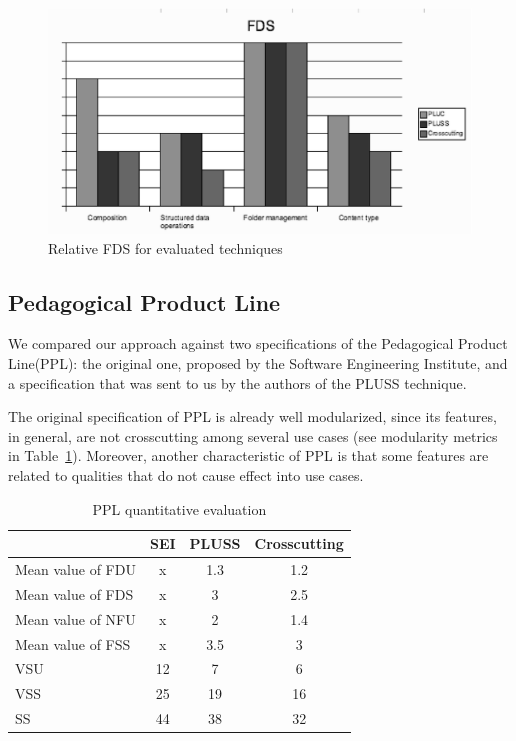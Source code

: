 \documentclass{acm_proc_article-sp}
\begin{document}
 \begin{figure}[h]
 \begin{center}
  \includegraphics[scale=0.35]{img/fds-mms.eps}
  \caption{Relative FDS for evaluated techniques}
  \label{fig:fds-mms}
  \end{center}
\end{figure}
  
\subsection{Pedagogical Product Line}

We compared our approach against two specifications of the Pedagogical Product Line(PPL): the original one, proposed by the Software Engineering Institute, and a specification that was sent to us by the authors of the PLUSS technique. 

The original specification of PPL is already well modularized, since its features, in general, are not crosscutting among several use cases (see modularity metrics in Table~\ref{tab:ppl-metrics}). Moreover, another characteristic of PPL is that some features are related to qualities that do not cause effect into use cases. 

\begin{table}[hb]
\centering
\caption{PPL quantitative evaluation}
\label{tab:ppl-metrics}
\begin{small}
\begin{tabular}{lccc} \hline
					& SEI 	& PLUSS 	& Crosscutting	\\ \hline
Mean value of FDU 		& x		& 1.3	& 1.2	\\
Mean value of FDS 		& x		& 3		& 2.5	\\
Mean value of NFU 		& x		& 2		& 1.4	\\
Mean value of FSS 		& x		& 3.5	& 3		\\ 
VSU 					& 12		& 7		& 6		\\
VSS 					& 25		& 19		& 16		\\
SS 					& 44		& 38		& 32		\\	\hline
\end{tabular}
\end{small}
\end{table}
\end{document}
